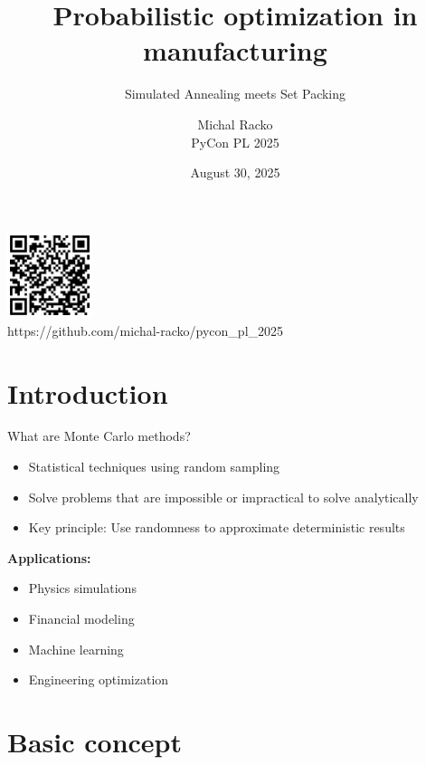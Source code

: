 \documentclass{beamer}
\title{Probabilistic optimization in manufacturing}
\subtitle{Simulated Annealing meets Set Packing}
\author{Michal Racko \\ PyCon PL 2025}
\date{August 30, 2025}
\begin{document}
\begin{frame}
  \titlepage
  \vspace{-0.5cm}
  \begin{center}
    \includegraphics[width=2.5cm]{images/github.png}
    \\[0.2cm]
    \small{https://github.com/michal-racko/pycon\_pl\_2025}
  \end{center}
\end{frame}


\section{Introduction}

\begin{frame}{What are Monte Carlo methods?}
  \begin{itemize}
    \item Statistical techniques using random sampling
    \item Solve problems that are impossible or impractical to solve analytically
    \item Key principle: Use randomness to approximate deterministic results
  \end{itemize}
  
  \vspace{0.5cm}
  \textbf{Applications:}
  \begin{itemize}
    \item Physics simulations
    \item Financial modeling
    \item Machine learning
    \item Engineering optimization
  \end{itemize}
\end{frame}

\section{Basic concept}
\end{document}
